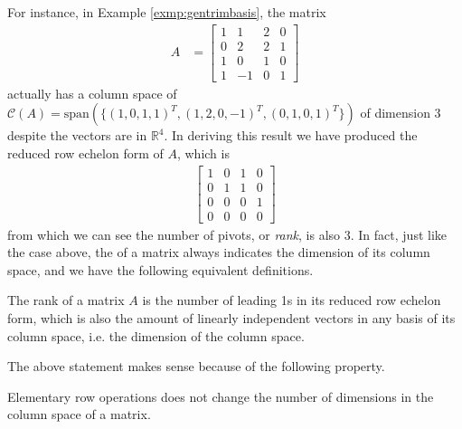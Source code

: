 For instance, in Example \ref{exmp:gentrimbasis}, the matrix
\begin{align*}
A &= 
\begin{bmatrix}
1 & 1 & 2 & 0\\
0 & 2 & 2 & 1\\
1 & 0 & 1 & 0\\
1 & -1 & 0 & 1
\end{bmatrix}
\end{align*}
actually has a column space of $\mathcal{C}(A) = \text{span}(\{(1,0,1,1)^T, (1,2,0,-1)^T, (0,1,0,1)^T\})$ of dimension $3$ despite the vectors are in $\mathbb{R}^4$. In deriving this result we have produced the reduced row echelon form of $A$, which is 
\begin{align*}
\begin{bmatrix}
1 & 0 & 1 & 0 \\
0 & 1 & 1 & 0 \\
0 & 0 & 0 & 1 \\
0 & 0 & 0 & 0 
\end{bmatrix}
\end{align*}
from which we can see the number of pivots, or \textit{rank}, is also $3$. In fact, just like the case above, the  of a matrix always indicates the dimension of its column space, and we have the following equivalent definitions.
\begin{defn}[Rank]
\label{defn:rank}
The rank of a matrix $A$ is the number of leading 1s in its reduced row echelon form, which is also the amount of linearly independent vectors in any basis of its column space, i.e. the dimension of the column space.
\end{defn}
The above statement makes sense because of the following property.
\begin{proper}
\label{proper:elemrowopcolrank}
Elementary row operations does not change the number of dimensions in the column space of a matrix.
\end{proper}
